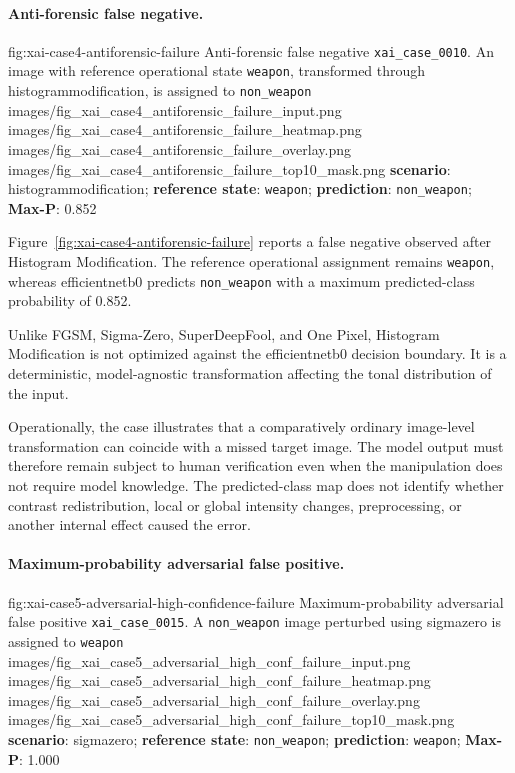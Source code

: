 \paragraph{Anti-forensic false negative.}

\XAIcaseFigureMaskGrid
{fig:xai-case4-antiforensic-failure}
{Anti-forensic false negative \texttt{xai\_case\_0010}. An image with
reference operational state \texttt{weapon}, transformed through
\gls{histogrammodification}, is assigned to \texttt{non\_weapon}}
{images/fig_xai_case4_antiforensic_failure_input.png}
{images/fig_xai_case4_antiforensic_failure_heatmap.png}
{images/fig_xai_case4_antiforensic_failure_overlay.png}
{images/fig_xai_case4_antiforensic_failure_top10_mask.png}
{\textbf{scenario}: \gls{histogrammodification};
\textbf{reference state}: \texttt{weapon};
\textbf{prediction}: \texttt{non\_weapon};
\textbf{Max-P}: 0.852}

Figure~\ref{fig:xai-case4-antiforensic-failure} reports a false negative
observed after Histogram Modification. The reference operational assignment
remains \texttt{weapon}, whereas \gls{efficientnetb0} predicts
\texttt{non\_weapon} with a maximum predicted-class probability of 0.852.

Unlike FGSM, Sigma-Zero, SuperDeepFool, and One Pixel, Histogram Modification
is not optimized against the \gls{efficientnetb0} decision boundary. It is a
deterministic, model-agnostic transformation affecting the tonal distribution
of the input.

Operationally, the case illustrates that a comparatively ordinary image-level
transformation can coincide with a missed target image. The model output must
therefore remain subject to human verification even when the manipulation does
not require model knowledge. The predicted-class map does not identify whether
contrast redistribution, local or global intensity changes, preprocessing, or
another internal effect caused the error.

\paragraph{Maximum-probability adversarial false positive.}

\XAIcaseFigureMaskGrid
{fig:xai-case5-adversarial-high-confidence-failure}
{Maximum-probability adversarial false positive
\texttt{xai\_case\_0015}. A \texttt{non\_weapon} image perturbed using
\gls{sigmazero} is assigned to \texttt{weapon}}
{images/fig_xai_case5_adversarial_high_conf_failure_input.png}
{images/fig_xai_case5_adversarial_high_conf_failure_heatmap.png}
{images/fig_xai_case5_adversarial_high_conf_failure_overlay.png}
{images/fig_xai_case5_adversarial_high_conf_failure_top10_mask.png}
{\textbf{scenario}: \gls{sigmazero};
\textbf{reference state}: \texttt{non\_weapon};
\textbf{prediction}: \texttt{weapon};
\textbf{Max-P}: 1.000}

